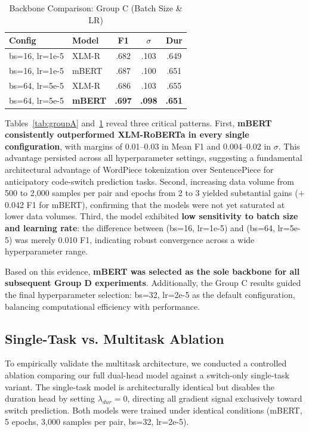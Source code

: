 \documentclass[sigconf,nonacm]{acmart}
\begin{document}
\begin{table}[h]
\centering
\small
\caption{Backbone Comparison: Group C (Batch Size \& LR)}
\label{tab:groupC}
\begin{tabular}{llccc}
\toprule
\textbf{Config} & \textbf{Model} & \textbf{F1} & \textbf{$\sigma$} & \textbf{Dur} \\
\midrule
bs=16, lr=1e-5 & XLM-R & .682 & .103 & .649 \\
bs=16, lr=1e-5 & mBERT & .687 & .100 & .651 \\
\midrule
bs=64, lr=5e-5 & XLM-R & .686 & .103 & .655 \\
bs=64, lr=5e-5 & \textbf{mBERT} & \textbf{.697} & \textbf{.098} & \textbf{.651} \\
\bottomrule
\end{tabular}
\end{table}

Tables~\ref{tab:groupA} and~\ref{tab:groupC} reveal three critical patterns. First, \textbf{mBERT consistently outperformed XLM-RoBERTa in every single configuration}, with margins of 0.01--0.03 in Mean F1 and 0.004--0.02 in $\sigma$. This advantage persisted across all hyperparameter settings, suggesting a fundamental architectural advantage of WordPiece tokenization over SentencePiece for anticipatory code-switch prediction tasks. Second, increasing data volume from 500 to 2,000 samples per pair and epochs from 2 to 3 yielded substantial gains ($+$0.042 F1 for mBERT), confirming that the models were not yet saturated at lower data volumes. Third, the model exhibited \textbf{low sensitivity to batch size and learning rate}: the difference between (bs=16, lr=1e-5) and (bs=64, lr=5e-5) was merely 0.010 F1, indicating robust convergence across a wide hyperparameter range.

Based on this evidence, \textbf{mBERT was selected as the sole backbone for all subsequent Group D experiments}. Additionally, the Group C results guided the final hyperparameter selection: bs=32, lr=2e-5 as the default configuration, balancing computational efficiency with performance.

\subsection{Single-Task vs. Multitask Ablation}
To empirically validate the multitask architecture, we conducted a controlled ablation comparing our full dual-head model against a switch-only single-task variant. The single-task model is architecturally identical but disables the duration head by setting \(\lambda_{dur} = 0\), directing all gradient signal exclusively toward switch prediction. Both models were trained under identical conditions (mBERT, 5 epochs, 3,000 samples per pair, bs=32, lr=2e-5).
\end{document}
